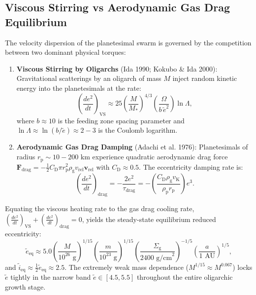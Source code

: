 \documentclass[11pt,a4paper]{article}
\begin{document}
\subsection{Viscous Stirring vs Aerodynamic Gas Drag Equilibrium}
The velocity dispersion of the planetesimal swarm is governed by the competition between two dominant physical torques:
\begin{enumerate}
    \item \textbf{Viscous Stirring by Oligarchs} (Ida 1990; Kokubo \& Ida 2000): Gravitational scatterings by an oligarch of mass $M$ inject random kinetic energy into the planetesimals at the rate:
    \begin{equation}
    \left( \frac{de^2}{dt} \right)_{\text{VS}} \approx 25 \left( \frac{M}{M_*} \right)^{4/3} \left( \frac{\Omega}{b\, \tilde{e}^2} \right) \ln \Lambda,
    \end{equation}
    where $b \approx 10$ is the feeding zone spacing parameter and $\ln \Lambda \approx \ln(b / \tilde{e}) \approx 2 - 3$ is the Coulomb logarithm.
    \item \textbf{Aerodynamic Gas Drag Damping} (Adachi et al. 1976): Planetesimals of radius $r_{\text{p}} \sim 10 - 200\text{ km}$ experience quadratic aerodynamic drag force $\mathbf{F}_{\text{drag}} = -\frac{1}{2} C_{\text{D}} \pi r_{\text{p}}^2 \rho_{\text{g}} v_{\text{rel}} \mathbf{v}_{\text{rel}}$ with $C_{\text{D}} \approx 0.5$. The eccentricity damping rate is:
    \begin{equation}
    \left( \frac{de^2}{dt} \right)_{\text{drag}} = - \frac{2 e^2}{\tau_{\text{drag}}} = - \left( \frac{C_{\text{D}} \rho_{\text{g}} v_{\text{K}}}{\rho_{\text{p}} r_{\text{p}}} \right) e^3.
    \end{equation}
\end{enumerate}

Equating the viscous heating rate to the gas drag cooling rate, $\left( \frac{de^2}{dt} \right)_{\text{VS}} + \left( \frac{de^2}{dt} \right)_{\text{drag}} = 0$, yields the steady-state equilibrium reduced eccentricity:
\begin{equation}
\tilde{e}_{\text{eq}} \approx 5.0 \left( \frac{M}{10^{26}\text{ g}} \right)^{1/15} \left( \frac{m}{10^{23}\text{ g}} \right)^{1/15} \left( \frac{\Sigma_{\text{g}}}{2400\text{ g/cm}^2} \right)^{-1/5} \left( \frac{a}{1\text{ AU}} \right)^{1/5},
\end{equation}
and $\tilde{i}_{\text{eq}} \approx \frac{1}{2} \tilde{e}_{\text{eq}} \approx 2.5$. The extremely weak mass dependence ($M^{1/15} \approx M^{0.067}$) locks $\tilde{e}$ tightly in the narrow band $\tilde{e} \in [4.5, 5.5]$ throughout the entire oligarchic growth stage.
\end{document}
